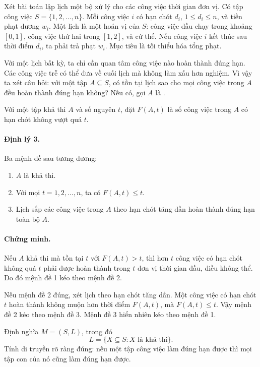 \documentclass[11pt]{article}
\begin{document}
Xét bài toán lập lịch một bộ xử lý cho các công việc thời gian đơn vị. Có tập
công việc \(S=\{1,2,\ldots,n\}\). Mỗi công việc \(i\) có hạn chót
\(d_i\), \(1\le d_i\le n\), và tiền phạt dương \(w_i\). Một lịch là một hoán
vị của \(S\): công việc đầu chạy trong khoảng \([0,1]\), công việc thứ hai
trong \([1,2]\), và cứ thế. Nếu công việc \(i\) kết thúc sau thời điểm \(d_i\),
ta phải trả phạt \(w_i\). Mục tiêu là tối thiểu hóa tổng phạt.

Với một lịch bất kỳ, ta chỉ cần quan tâm công việc nào hoàn thành đúng hạn.
Các công việc trễ có thể đưa về cuối lịch mà không làm xấu hơn nghiệm. Vì vậy
ta xét câu hỏi: với một tập \(A\subseteq S\), có tồn tại lịch sao cho mọi công
việc trong \(A\) đều hoàn thành đúng hạn không? Nếu có, gọi \(A\) là
.

Với một tập khả thi \(A\) và số nguyên \(t\), đặt \(F(A,t)\) là số công việc
trong \(A\) có hạn chót không vượt quá \(t\).

\paragraph{Định lý 3.}
Ba mệnh đề sau tương đương:
\begin{enumerate}
  \item \(A\) là khả thi.
  \item Với mọi \(t=1,2,\ldots,n\), ta có \(F(A,t)\le t\).
  \item Lịch sắp các công việc trong \(A\) theo hạn chót tăng dần hoàn thành
        đúng hạn toàn bộ \(A\).
\end{enumerate}

\paragraph{Chứng minh.}
Nếu \(A\) khả thi mà tồn tại \(t\) với \(F(A,t)>t\), thì hơn \(t\) công việc có
hạn chót không quá \(t\) phải được hoàn thành trong \(t\) đơn vị thời gian đầu,
điều không thể. Do đó mệnh đề 1 kéo theo mệnh đề 2.

Nếu mệnh đề 2 đúng, xét lịch theo hạn chót tăng dần. Một công việc có hạn chót
\(t\) hoàn thành không muộn hơn thời điểm \(F(A,t)\), mà \(F(A,t)\le t\). Vậy
mệnh đề 2 kéo theo mệnh đề 3. Mệnh đề 3 hiển nhiên kéo theo mệnh đề 1.

Định nghĩa \(M=(S,L)\), trong đó
\[
  L=\{X\subseteq S: X \text{ là khả thi}\}.
\]
Tính di truyền rõ ràng đúng: nếu một tập công việc làm đúng hạn được thì mọi
tập con của nó cũng làm đúng hạn được.
\end{document}

